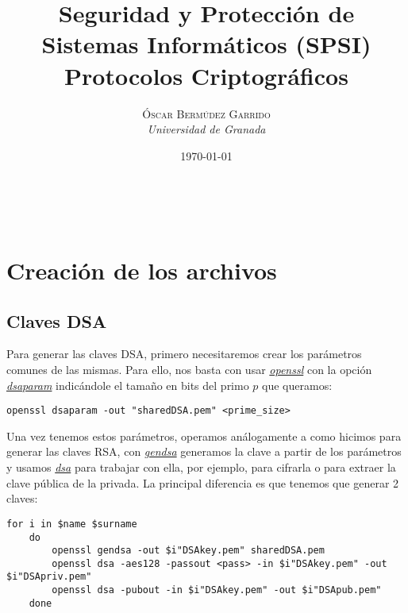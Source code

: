 \documentclass[a4paper, 11pt]{article}
\title{\textbf{Seguridad y Protección de Sistemas Informáticos (SPSI)}\\ %
Protocolos Criptográficos} %
\author{\textsc{Óscar Bermúdez Garrido} %
\\{\textit{Universidad de Granada}}} %
\date{\today} %
\makeatletter
\renewcommand{\maketitle}{
  \begin{flushright} %
  
  {\LARGE\@title} %
  
  \vspace{50pt} %
  
  {\large\@author} %
  \\\@date %
  \vspace{40pt} %
  \end{flushright}
}
\makeatother
\begin{document}
\maketitle %

\renewcommand{\abstractname}{Resumen} %

{\parskip=2pt
  \tableofcontents
}
\pagebreak


\section{Creación de los archivos}
	\subsection{Claves DSA}
		Para generar las claves DSA, primero necesitaremos crear los parámetros comunes de las mismas. Para ello, nos basta
		con usar \href{http://manpages.ubuntu.com/manpages/zesty/en/man1/openssl.1ssl.html}{\textit{openssl}} con la opción
		\href{https://www.openssl.org/docs/man1.0.2/apps/dsaparam.html}{\textit{dsaparam}} indicándole el tamaño en bits del
		primo $p$ que queramos:
		\begin{small}
			\verb|openssl dsaparam -out "sharedDSA.pem" <prime_size>|
		\end{small}

		Una vez tenemos estos parámetros, operamos análogamente a como hicimos para generar las claves RSA, con
		\href{https://www.openssl.org/docs/man1.0.2/apps/gendsa.html}{\textit{gendsa}} generamos la clave a partir de los
		parámetros y usamos \href{https://www.openssl.org/docs/man1.0.2/apps/dsa.html}{\textit{dsa}} para trabajar con ella,
		por ejemplo, para cifrarla o para extraer la clave pública de la privada. La principal diferencia es que tenemos que
		generar 2 claves:

		\begin{small}
			\verb|for i in $name $surname| \\
			\verb|    do| \\
			\verb|        openssl gendsa -out $i"DSAkey.pem" sharedDSA.pem| \\
			\verb|        openssl dsa -aes128 -passout <pass> -in $i"DSAkey.pem" -out $i"DSApriv.pem"| \\
			\verb|        openssl dsa -pubout -in $i"DSAkey.pem" -out $i"DSApub.pem"| \\
			\verb|    done| \\
		\end{small}
		
\end{document}

